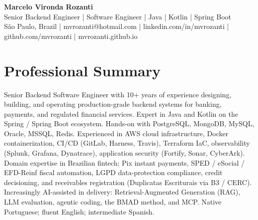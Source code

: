 \documentclass[10pt,a4paper]{article}
\begin{document}
\begin{center}
{\Large\bfseries Marcelo Vironda Rozanti}\\[2pt]
Senior Backend Engineer | Software Engineer | Java | Kotlin | Spring Boot\\[2pt]
São Paulo, Brazil | mvrozanti@hotmail.com | linkedin.com/in/mvrozanti | github.com/mvrozanti | mvrozanti.github.io
\end{center}

\section{Professional Summary}
Senior Backend Software Engineer with 10+ years of experience designing, building, and operating production-grade backend systems for banking, payments, and regulated financial services. Expert in Java and Kotlin on the Spring / Spring Boot ecosystem. Hands-on with PostgreSQL, MongoDB, MySQL, Oracle, MSSQL, Redis. Experienced in AWS cloud infrastructure, Docker containerization, CI/CD (GitLab, Harness, Travis), Terraform IaC, observability (Splunk, Grafana, Dynatrace), application security (Fortify, Sonar, CyberArk). Domain expertise in Brazilian fintech: Pix instant payments, SPED / eSocial / EFD-Reinf fiscal automation, LGPD data-protection compliance, credit decisioning, and receivables registration (Duplicatas Escriturais via B3 / CERC). Increasingly AI-assisted in delivery: Retrieval-Augmented Generation (RAG), LLM evaluation, agentic coding, the BMAD method, and MCP. Native Portuguese; fluent English; intermediate Spanish.
\end{document}
